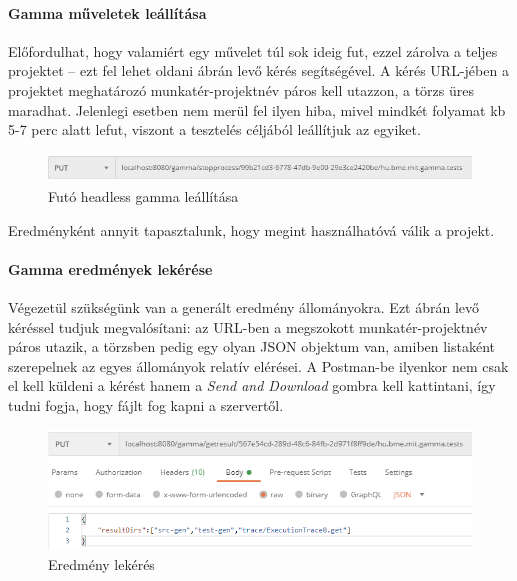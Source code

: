 \paragraph{Gamma műveletek leállítása} Előfordulhat, hogy valamiért egy művelet túl sok ideig fut, ezzel zárolva a teljes projektet -- ezt fel lehet oldani  ábrán levő kérés segítségével. A kérés URL-jében a projektet meghatározó munkatér-projektnév páros kell utazzon, a törzs üres maradhat. Jelenlegi esetben nem merül fel ilyen hiba, mivel mindkét folyamat kb 5-7 perc alatt lefut, viszont a tesztelés céljából leállítjuk az egyiket.


\begin{figure}[!ht]
	\includegraphics[width=150mm, keepaspectratio]{figures/stop_gamma_request.PNG}
	\caption{Futó headless gamma leállítása}
	\label{fig:stop_gamma_request}
\end{figure}

\noindent Eredményként annyit tapasztalunk, hogy megint használhatóvá válik a projekt.

\paragraph{Gamma eredmények lekérése} Végezetül szükségünk van a generált eredmény állományokra. Ezt  ábrán levő kéréssel tudjuk megvalósítani: az URL-ben a megszokott munkatér-projektnév páros utazik, a törzsben pedig egy olyan JSON objektum van, amiben listaként szerepelnek az egyes állományok relatív elérései. A Postman-be ilyenkor nem csak el kell küldeni a kérést hanem a \textit{Send and Download} gombra kell kattintani, így tudni fogja, hogy fájlt fog kapni a szervertől.

\begin{figure}[!ht]
	\includegraphics[width=150mm, keepaspectratio]{figures/get_result_request.PNG}
	\caption{Eredmény lekérés}
	\label{fig:get_result_request}
\end{figure}

